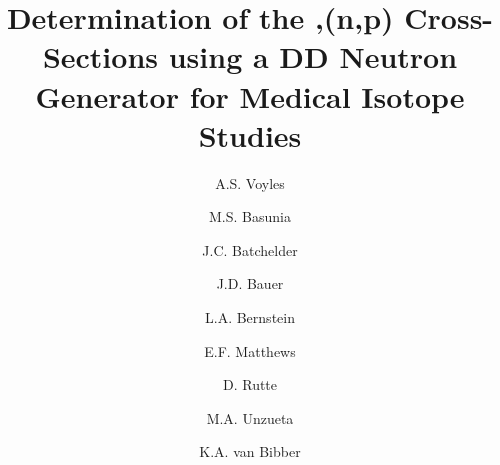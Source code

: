 \documentclass[5p]{elsarticle}
\begin{document}
\begin{frontmatter}


\title{Determination of the ,(n,p) Cross-Sections using a DD Neutron Generator for Medical Isotope Studies}




\author[ucb]{A.S. Voyles }

\author[lbl]{M.S. Basunia}

\author[lbl]{J.C. Batchelder}

\author[llnl]{J.D. Bauer}

\author[ucb,lbl]{L.A. Bernstein}

\author[ucb]{E.F. Matthews}

\author[geo,eps]{D. Rutte}

\author[ucb]{M.A. Unzueta}

\author[ucb]{K.A. van Bibber}









\end{frontmatter}
\end{document}
